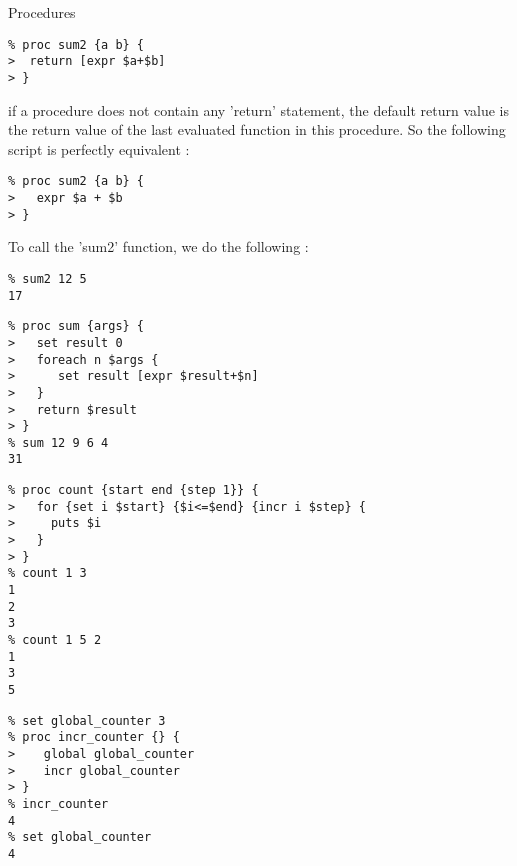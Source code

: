 \begin{frame}[containsverbatim]{Procedures}
\lstset{language=tcl}
\begin{lstlisting}
% proc sum2 {a b} {
>  return [expr $a+$b]
> }
\end{lstlisting}

if a procedure does not contain any 'return' statement, the default return value is the return value of the last evaluated function in this procedure. So the following script is perfectly equivalent : 

\begin{lstlisting}
% proc sum2 {a b} {
>   expr $a + $b
> }
\end{lstlisting}

To call the 'sum2' function, we do the following : 

\begin{lstlisting}
% sum2 12 5
17
\end{lstlisting}
\end{frame}


\begin{frame}[containsverbatim]{}
\lstset{language=tcl}
\begin{lstlisting}
% proc sum {args} {
>   set result 0
>   foreach n $args {
>      set result [expr $result+$n]
>   }
>   return $result
> }
% sum 12 9 6 4
31
\end{lstlisting}
\end{frame}


\begin{frame}[containsverbatim]{}
\lstset{language=tcl}
\begin{lstlisting}
% proc count {start end {step 1}} {
>   for {set i $start} {$i<=$end} {incr i $step} {
>     puts $i
>   }
> }
% count 1 3
1
2
3
% count 1 5 2
1
3
5
\end{lstlisting}
\end{frame}


\begin{frame}[containsverbatim]{}
\lstset{language=tcl}
\begin{lstlisting}
% set global_counter 3
% proc incr_counter {} {
>    global global_counter
>    incr global_counter
> }
% incr_counter
4
% set global_counter
4
\end{lstlisting}
\end{frame}

